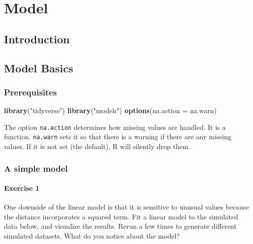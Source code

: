 \documentclass[]{book}
\newenvironment{Shaded}{\begin{snugshade}}{\end{snugshade}}
\newcommand{\DataTypeTok}[1]{\textcolor[rgb]{0.13,0.29,0.53}{#1}}
\newcommand{\KeywordTok}[1]{\textcolor[rgb]{0.13,0.29,0.53}{\textbf{#1}}}
\newcommand{\NormalTok}[1]{#1}
\newcommand{\StringTok}[1]{\textcolor[rgb]{0.31,0.60,0.02}{#1}}
\theoremstyle{plain}
\theoremstyle{remark}
\theoremstyle{definition}
\theoremstyle{definition}
\theoremstyle{definition}
\theoremstyle{remark}
\begin{document}
\hypertarget{part-model}{%
\part{Model}\label{part-model}}

\hypertarget{model-intro}{%
\chapter{Introduction}\label{model-intro}}

\hypertarget{model-basics}{%
\chapter{Model Basics}\label{model-basics}}

\hypertarget{prerequisites}{%
\section{Prerequisites}\label{prerequisites}}

\begin{Shaded}
\begin{Highlighting}[]
\KeywordTok{library}\NormalTok{(}\StringTok{"tidyverse"}\NormalTok{)}
\KeywordTok{library}\NormalTok{(}\StringTok{"modelr"}\NormalTok{)}
\KeywordTok{options}\NormalTok{(}\DataTypeTok{na.action =}\NormalTok{ na.warn)}
\end{Highlighting}
\end{Shaded}

The option \texttt{na.action} determines how missing values are handled.
It is a function. \texttt{na.warn} sets it so that there is a warning if
there are any missing values. If it is not set (the default), R will
silently drop them.

\hypertarget{a-simple-model}{%
\section{A simple model}\label{a-simple-model}}

\hypertarget{exercise-1-62}{%
\subsection{Exercise 1}\label{exercise-1-62}}

One downside of the linear model is that it is sensitive to unusual
values because the distance incorporates a squared term. Fit a linear
model to the simulated data below, and visualize the results. Rerun a
few times to generate different simulated datasets. What do you notice
about the model?
\end{document}
